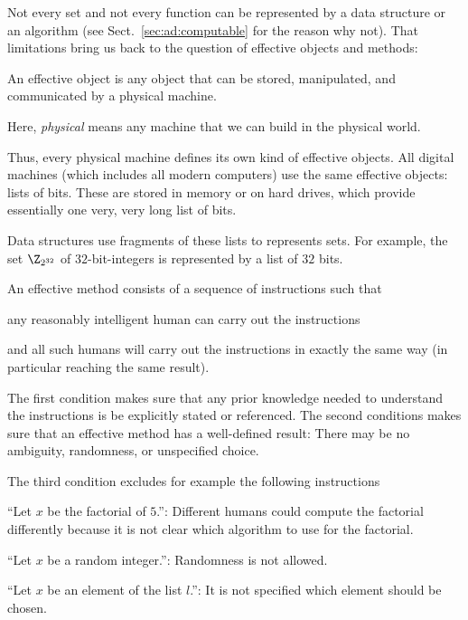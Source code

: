 Not every set and not every function can be represented by a data structure or an algorithm (see Sect.~\ref{sec:ad:computable} for the reason why not).
That limitations bring us back to the question of effective objects and methods:

\begin{definition}
An effective object is any object that can be stored, manipulated, and communicated by a physical machine.

Here, \emph{physical} means any machine that we can build in the physical world.\footnotemark
\end{definition}

Thus, every physical machine defines its own kind of effective objects.
All digital machines (which includes all modern computers) use the same effective objects: lists of bits.
These are stored in memory or on hard drives, which provide essentially one very, very long list of bits.

Data structures use fragments of these lists to represents sets.
For example, the set $\Z_{2^{32}}$ of $32$-bit-integers is represented by a list of $32$ bits.

\begin{definition}
An effective method consists of a sequence of instructions such that
\begin{compactitem}
 \item any reasonably intelligent human can carry out the instructions
 \item and all such humans will carry out the instructions in exactly the same way (in particular reaching the same result).
\end{compactitem}
\end{definition}

The first condition makes sure that any prior knowledge needed to understand the instructions is be explicitly stated or referenced.
The second conditions makes sure that an effective method has a well-defined result: There may be no ambiguity, randomness, or unspecified choice.

\begin{example}
The third condition excludes for example the following instructions
\begin{compactitem}
 \item ``Let $x$ be the factorial of $5$.'': Different humans could compute the factorial differently because it is not clear which algorithm to use for the factorial.
 \item ``Let $x$ be a random integer.'': Randomness is not allowed.
 \item ``Let $x$ be an element of the list $l$.'': It is not specified which element should be chosen.
\end{compactitem} 
\end{example}

